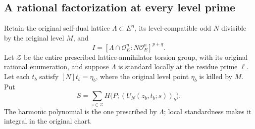 \subsection*{A rational factorization at every level prime}

Retain the original self-dual lattice $\Lambda\subset E^n$, its
level-compatible odd $N$ divisible by the original level $M$, and
\[
 I=[\Lambda\cap\mathcal O_E^n:N\mathcal O_E^n]^{p+q}.
\]
Let $\mathcal Z$ be the entire prescribed lattice-annihilator torsion
group, with its original rational enumeration, and suppose
$\Lambda$ is standard locally at the residue prime $\ell$.
Let each $t_b$ satisfy $[N]t_b=\eta_b$, where the original level point
$\eta_b$ is killed by $M$.  Put
\[
 S=\sum_{z\in\mathcal Z}H\bigl(P;(U_N(z_b,t_b;s))_b\bigr).
\]
The harmonic polynomial is the one prescribed by $\Lambda$; local
standardness makes it integral in the original chart.

